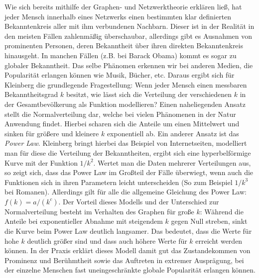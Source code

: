 Wie sich bereits mithilfe der Graphen- und Netzwerktheorie erklären ließ, hat jeder Mensch innerhalb eines Netzwerks einen bestimmten klar definierten Bekanntenkreis aller mit ihm verbundenen Nachbarn.
Dieser ist in der Realität in den meisten Fällen zahlenmäßig überschaubar, allerdings gibt es Ausnahmen von prominenten Personen, deren Bekanntheit über ihren direkten Bekanntenkreis hinausgeht.
In manchen Fällen (z.B. bei Barack Obama) kommt es sogar zu globaler Bekanntheit.
Das selbe Phänomen erkennen wir bei anderen Medien, die Popularität erlangen können wie Musik, Bücher, etc.
Daraus ergibt sich für Kleinberg die grundlegende Fragestellung:
Wenn jeder Mensch einen messbaren Bekanntheitsgrad $k$ besitzt, wie lässt sich die Verteilung der verschiedenen $k$ in der Gesamtbevölkerung als Funktion modellieren?
Einen naheliegenden Ansatz stellt die Normalverteilung dar, welche bei vielen Phänomenen in der Natur Anwendung findet.
Hierbei scharen sich die Anteile um einen Mittelwert und sinken für größere und kleinere $k$ exponentiell ab.
Ein anderer Ansatz ist das \emph{Power Law}.
Kleinberg bringt hierbei das Beispiel von Internetseiten, modelliert man für diese die Verteilung der Bekanntheiten, ergibt sich eine hyperbelförmige Kurve mit der Funktion $1/ k^2 $.
Wertet man die Daten mehrerer Verteilungen aus, so zeigt sich, dass das Power Law im Großteil der Fälle überwiegt, wenn auch die Funktionen sich in ihren Parametern leicht unterscheiden (So zum Beispiel $1/ k^3$ bei Romanen).
Allerdings gilt für alle die allgemeine Gleichung des Power Law:
$f(k) = a/(k^c)$.
Der Vorteil dieses Modells und der Unterschied zur Normalverteilung besteht im Verhalten des Graphen für große $k$:
Während die Anteile bei exponentieller Abnahme mit steigendem $k$ gegen Null streben, sinkt die Kurve beim Power Law deutlich langsamer.
Das bedeutet, dass die Werte für hohe $k$ deutlich größer sind und dass auch höhere Werte für $k$ erreicht werden können.
In der Praxis erklärt dieses Modell damit gut das Zustandekommen von Prominenz und Berühmtheit sowie das Auftreten in extremer Ausprägung, bei der einzelne Menschen fast uneingeschränkte globale Popularität erlangen können.